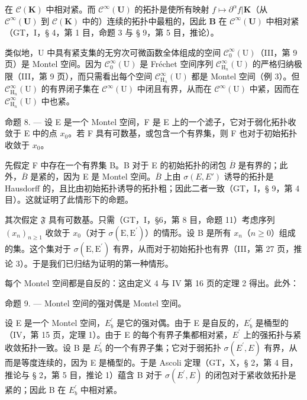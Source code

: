 在 \(\mathcal{C}(\mathbf{K})\) 中相对紧。而 \(\mathcal{C}^{\infty}(\mathbf{U})\) 的拓扑是使所有映射 \(f\mapsto \partial^{\alpha}f|\mathbf{K}\)（从 \(\mathcal{C}^{\infty}(\mathbf{U})\) 到 \(\mathcal{C}(\mathbf{K})\) 中的）连续的拓扑中最粗的，因此 \(\mathbf{B}\) 在 \(\mathcal{C}^{\infty}(\mathbf{U})\) 中相对紧（GT，I，§ 4，第 1 目，命题 3 与 § 9，第 5 目，推论）。

类似地，U 中具有紧支集的无穷次可微函数全体组成的空间 \(\mathcal{C}_0^\infty (\mathrm{U})\)（III，第 9 页）是 Montel 空间。因为 \(\mathcal{C}_0^\infty (\mathrm{U})\) 是 Fréchet 空间序列 \(\mathcal{C}_{\mathrm{H}_n}^\infty (\mathrm{U})\) 的严格归纳极限（III，第 9 页），而只需看出每个空间 \(\mathcal{C}_{\mathrm{H}_n}^\infty (\mathrm{U})\) 都是 Montel 空间（例 3）。但 \(\mathcal{C}_{\mathrm{H}_n}^\infty (\mathrm{U})\) 的有界闭子集在 \(\mathcal{C}^{\infty}(\mathrm{U})\) 中闭且有界，从而在 \(\mathcal{C}^{\infty}(\mathrm{U})\) 中紧，因而在 \(\mathcal{C}_{\mathrm{H}_n}^\infty (\mathrm{U})\) 中也紧。

命题 8. --- 设 E 是一个 Montel 空间，F 是 E 上的一个滤子，它对于弱化拓扑收敛于 E 中的点 \(x_{0}\)。若 F 具有可数基，或包含一个有界集，则 F 也对于初始拓扑收敛于 \(x_{0}\)。

先假定 F 中存在一个有界集 B。B 对于 E 的初始拓扑的闭包 \(\overline{B}\) 是有界的；此外，\(\overline{B}\) 是紧的，因为 E 是 Montel 空间。\(\overline{B}\) 上由 \(\sigma(E, E')\) 诱导的拓扑是 Hausdorff 的，且比由初始拓扑诱导的拓扑粗；因此二者一致（GT，I，§ 9，第 4 目）。这就证明了此情形下的命题。

其次假定 \(\mathfrak{F}\) 具有可数基。只需（GT，I，§6，第 8 目，命题 11）考虑序列 \((x_{n})_{n\geqslant 1}\) 收敛于 \(x_0\)（对于 \(\sigma (\mathrm{E},\mathrm{E}^{\prime})\)）的情形。设 B 是所有 \(x_{n}\)（\(n\geqslant 0\)）组成的集。这个集对于 \(\sigma (\mathrm{E},\mathrm{E}^{\prime})\) 有界，从而对于初始拓扑也有界（III，第 27 页，推论 3）。于是我们已归结为证明的第一种情形。

每个 Montel 空间都是自反的：这由定义 4 与 IV 第 16 页的定理 2 得出。此外：

命题 9. --- Montel 空间的强对偶是 Montel 空间。

设 E 是一个 Montel 空间，\(E_{b}^{\prime}\) 是它的强对偶。由于 E 是自反的，\(E_{b}^{\prime}\) 是桶型的（IV，第 15 页，定理 1）。由于 E 的每个有界子集都相对紧，\(E^{\prime}\) 上的强拓扑与紧收敛拓扑一致。设 B 是 \(E_{b}^{\prime}\) 的一个有界子集；它对于弱拓扑 \(\sigma(E^{\prime}, E)\) 有界，从而是等度连续的，因为 E 是桶型的。于是 Ascoli 定理（GT，X，§ 2，第 4 目，推论与 § 2，第 5 目，推论 1）蕴含 B 对于 \(\sigma(E^{\prime}, E)\) 的闭包对于紧收敛拓扑是紧的；因此 B 在 \(E_{b}^{\prime}\) 中相对紧。

